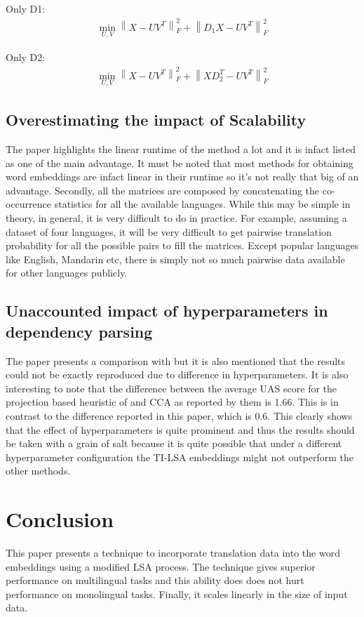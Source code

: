 \documentclass[11pt]{article}
\begin{document}
Only D1:
\begin{multline}
\min_{U,V}\left\lVert X - UV^T \right\rVert^{2}_F + \left\lVert D_{1}X - UV^T \right\rVert^{2}_F
\end{multline}

Only D2:
\begin{multline}
\min_{U,V}\left\lVert X - UV^T \right\rVert^{2}_F + \left\lVert XD^{T}_2 - UV^T \right\rVert^{2}_F
\end{multline}


\subsection{Overestimating the impact of Scalability}
The paper highlights the linear runtime of the method a lot and it is infact listed as one of the main advantage. It must be noted that most methods for obtaining word embeddings are infact linear in their runtime so it's not really that big of an advantage. Secondly, all the matrices are composed by concatenating the co-occurrence statistics for all the available languages. While this may be simple in theory, in general, it is very difficult to do in practice. For example, assuming a dataset of four languages, it will be very difficult to get pairwise translation probability for all the possible pairs to fill the matrices. Except popular languages like English, Mandarin etc, there is simply not so much pairwise data available for other languages publicly.

\subsection{Unaccounted impact of hyperparameters in dependency parsing}
The paper presents a comparison with \cite{guo2015cross} but it is also mentioned that the results could not be exactly reproduced due to difference in hyperparameters. It is also interesting to note that the difference between the average UAS score for the projection based heuristic of \cite{guo2015cross} and CCA as reported by them  is 1.66. This is in contrast to the difference reported in this paper, which is 0.6. This clearly shows that the effect of hyperparameters is quite prominent and thus the results should be taken with a grain of salt because it is quite possible that under a different hyperparameter configuration the TI-LSA embeddings might not outperform the other methods.

\section{Conclusion}
This paper presents a technique to incorporate translation data into the word embeddings using a modified LSA process. The technique gives superior performance on multilingual tasks and this ability does does not hurt performance on monolingual tasks. Finally, it scales linearly in the size of input data.




\end{document}
